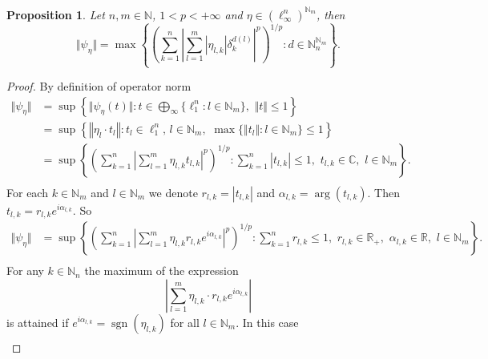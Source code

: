 \documentclass[12pt]{article}
\newtheorem{proposition}[theorem]{Proposition}
\begin{document}
\begin{proposition}\label{ExtMorphNorm}
    Let $n,m\in\mathbb{N}$, $1<p<+\infty$ 
    and $\eta\in(\ell_{\infty}^n)^{\mathbb{N}_m}$, then 
    \[
        \Vert \psi_{\eta}\Vert=\max\left\{
            \left(\sum_{k=1}^n
                \left|\sum_{l=1}^m |\eta_{l,k}| \delta_{k}^{d(l)}\right|^p
            \right)^{1/p} : 
            d\in\mathbb{N}_n^{\mathbb{N}_m}
        \right\}.
    \]
\end{proposition}
\begin{proof}
    By definition of operator norm
    \[
    \begin{aligned}
        \Vert\psi_{\eta}\Vert
        &=\sup\left\{
            \Vert\psi_{\eta}(t)\Vert:
            t\in \bigoplus_{\infty}\{\ell_1^n:l\in\mathbb{N}_m\},\,\,
            \Vert t\Vert\leq 1
        \right\} \\
        &=\sup\left\{
            \left\Vert\eta_{l}\cdot t_l\right\Vert:
            t_l\in\ell_1^n,\, l\in\mathbb{N}_m,\,\,
            \max\{\Vert t_l\Vert:l\in\mathbb{N}_m\}\leq 1
        \right\} \\
        &=\sup\left\{
            \left(\sum_{k=1}^n
                \left|\sum_{l=1}^{m}\eta_{l,k} t_{l,k}\right|^p
            \right)^{1/p}:
            \sum_{k=1}^n |t_{l,k}|\leq 1,\,\, 
            t_{l,k}\in\mathbb{C},\,\, l\in\mathbb{N}_m
        \right\}. \\
    \end{aligned}
    \]
    For each $k\in\mathbb{N}_m$ and $l\in\mathbb{N}_m$ we 
    denote $r_{l,k}=|t_{l,k}|$ and $\alpha_{l,k}=\operatorname{arg}(t_{l,k})$. 
    Then $t_{l,k}=r_{l,k} e^{i \alpha_{l,k}}$. So
    \[
    \begin{aligned}
        \Vert \psi_{\eta}\Vert
        &=\sup\left\{
            \left(\sum_{k=1}^n
                \left|
                    \sum_{l=1}^{m}\eta_{l,k} r_{l,k} e^{i \alpha_{l,k}}
                \right|^p
            \right)^{1/p}:
            \sum_{k=1}^n r_{l,k}\leq 1,\,\, 
            r_{l,k}\in\mathbb{R}_+,\,\, 
            \alpha_{l,k}\in\mathbb{R},\,\, 
            l\in\mathbb{N}_m
        \right\}. \\
    \end{aligned}
    \]
    For any $k\in\mathbb{N}_n$ the maximum of the expression 
    \[
        \left|\sum_{l=1}^{m}\eta_{l,k}\cdot r_{l,k} e^{i \alpha_{l,k}}\right|
    \]
    is attained if $e^{i \alpha_{l,k}}=\operatorname{sgn}(\eta_{l,k})$ for 
    all $l\in\mathbb{N}_m$. In this case
    \[
    \begin{aligned}

\end{aligned}\]
\end{proof}
\end{document}
